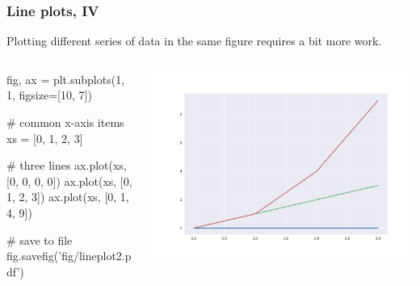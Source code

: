 \documentclass[english,serif,mathserif,xcolor=pdftex,dvipsnames,table]{beamer}
\begin{document}
\begin{frame}[fragile]
  \frametitle{Line plots, IV}
    Plotting different series of data in the same figure requires a bit more work.

\begin{columns}
    \begin{column}{0.5\linewidth}
      \begin{python}
fig, ax = plt.subplots(1, 1, figsize=[10, 7])

# common x-axis items
xs = [0, 1, 2, 3]

# three lines
ax.plot(xs, [0, 0, 0, 0])
ax.plot(xs, [0, 1, 2, 3])
ax.plot(xs, [0, 1, 4, 9])


# save to file
fig.savefig('fig/lineplot2.pdf')
      \end{python}
    \end{column}
    \begin{column}{0.5\linewidth}
      \begin{center}
        \includegraphics[width=1.0\linewidth]{fig/lineplot2.pdf}
      \end{center}
    \end{column}
  \end{columns}
\end{frame}
\end{document}
